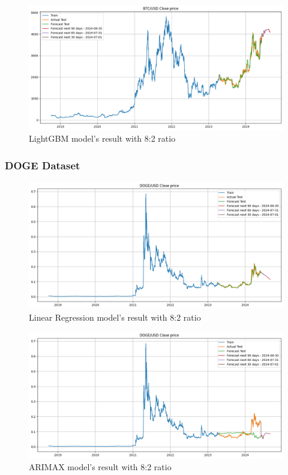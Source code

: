 \documentclass{ieeeojies}
\begin{document}
\begin{figure}[H]
    \centering 
    \includegraphics[width=0.8\linewidth]{./././visualize/LightGBM/ETH-80-20.png} 
    \caption{LightGBM model’s result with 8:2 ratio}
    \label{fig:28}
\end{figure}
\subsubsection{DOGE Dataset}
\begin{figure}[H]
    \centering 
    \includegraphics[width=0.8\linewidth]{./././visualize/LinearRegression/DOGE-80-20.png} 
    \caption{Linear Regression model’s result with 8:2 ratio}
    \label{fig:29}
\end{figure}
\begin{figure}[H]
    \centering 
    \includegraphics[width=0.8\linewidth]{./././visualize/ARIMAX/DOGE-80-20.png} 
    \caption{ARIMAX model’s result with 8:2 ratio}
    \label{fig:30}
\end{figure}
\end{document}
